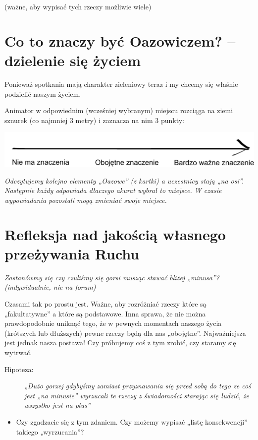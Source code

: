 \documentclass[a5paper,10pt,polish]{book}
\begin{document}
(ważne, aby wypisać tych rzeczy możliwie wiele)


\section{Co to znaczy być Oazowiczem? – dzielenie się życiem}
\label{babice2006-jesien-gliwice/spotkanie2:co-to-znaczy-byc-oazowiczem-dzielenie-sie-zyciem}
Ponieważ spotkania mają charakter zieleniowy teraz i my chcemy się właśnie podzielić naszym życiem.

Animator w odpowiednim (wcześniej wybranym) miejscu rozciąga na ziemi sznurek (co najmniej 3 metry) i zaznacza na nim 3 punkty:

{\hfill\includegraphics{arrow.pdf}\hfill}

\emph{Odczytujemy kolejno elementy „Oazowe” (z kartki) a uczestnicy stają „na osi”. Następnie każdy odpowiada dlaczego akurat wybrał to miejsce. W czasie wypowiadania pozostali mogą zmieniać swoje miejsce.}


\section{Refleksja nad jakością własnego przeżywania Ruchu}
\label{babice2006-jesien-gliwice/spotkanie2:refleksja-nad-jakoscia-wlasnego-przezywania-ruchu}
\emph{Zastanówmy się czy czuliśmy się gorsi musząc stawać bliżej „minusa”?(indywidualnie, nie na forum)}

Czasami tak po prostu jest. Ważne, aby rozróżniać rzeczy które są „fakultatywne” a które są podstawowe. Inna sprawa, że nie można prawdopodobnie uniknąć tego, że w pewnych momentach naszego życia (krótszych lub dłuższych) pewne rzeczy będą dla nas „obojętne”. Najważniejsza jest jednak nasza postawa! Czy próbujemy coś z  tym zrobić, czy staramy się wytrwać.
\begin{description}
\item[{Hipoteza:}] \leavevmode
\emph{„Dużo gorzej gdybyśmy zamiast przyznawania się przed sobą do tego ze coś jest „na minusie” wyrzucali te rzeczy z świadomości starając się łudzić, że wszystko jest na plus”}

\end{description}
\begin{itemize}
\item {} 
Czy zgadzacie się z tym zdaniem. Czy możemy wypisać „listę konsekwencji” takiego „wyrzucania”?

\end{itemize}
\end{document}

